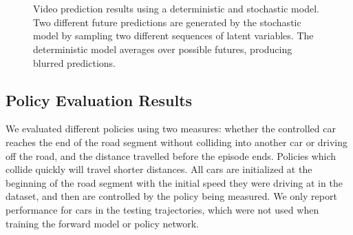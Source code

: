 \documentclass{article} %
\begin{document}
\begin{figure}[t!]
    \centering
     \\
     \\
    \label{prediction-results}
    \caption{Video prediction results using a deterministic and stochastic model. Two different future predictions are generated by the stochastic model by sampling two different sequences of latent variables. The deterministic model averages over possible futures, producing blurred predictions.}
\end{figure}









    \subsection{Policy Evaluation Results}

    We evaluated different policies using two measures: whether the controlled car reaches the end of the road segment without colliding into another car or driving off the road, and the distance travelled before the episode ends. Policies which collide quickly will travel shorter distances. All cars are initialized at the beginning of the road segment with the initial speed they were driving at in the dataset, and then are controlled by the policy being measured. We only report performance for cars in the testing trajectories, which were not used when training the forward model or policy network.
\end{document}

